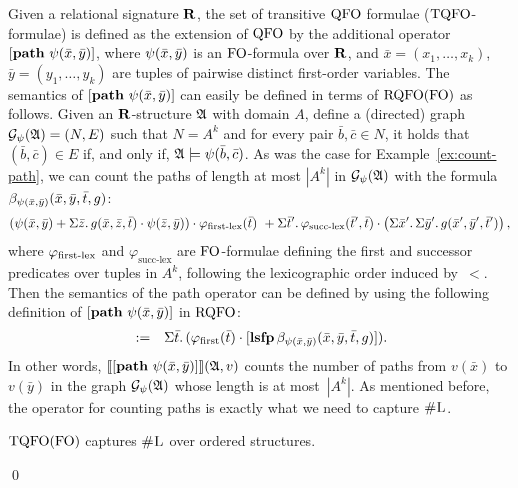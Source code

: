 Given a relational signature $\mathbf{R}$, the set of transitive ${\rm QFO}$ formulae (${\rm TQFO}$-formulae) is defined as the extension of ${\rm QFO}$ by the additional operator $[{\bf path} \,\, \psi(\bar{x},\bar{y})]$, where $\psi(\bar{x}, \bar{y})$ is an ${\rm FO}$-formula over $\mathbf{R}$, and $\bar{x} = (x_1, \ldots, x_k)$, $\bar{y} = (y_1, \ldots, y_k)$ are tuples of pairwise distinct first-order variables. The semantics of $[{\bf path} \,\, \psi(\bar{x},\bar{y})]$ can easily be defined in terms of ${\rm RQFO}({\rm FO})$ as follows. 
Given an $\mathbf{R}$-structure $\mathfrak{A}$ with domain $A$, define a (directed) graph $\mathcal{G}_{\psi}(\mathfrak{A}) = (N,E)$ such that $N = A^k$ and for every pair $\bar b, \bar c \in N$, it holds that $(\bar b, \bar c) \in E$ if, and only if, $\mathfrak{A} \models \psi(\bar b, \bar c)$.
As was the case for Example~\ref{ex:count-path}, we can count the paths of length at most $|A^k|$ in $ \mathcal{G}_{\psi}(\mathfrak{A})$ with the formula $\beta_{\psi(\bar{x},\bar{y})}(\bar{x}, \bar{y}, \bar{t}, g)$:
\begin{align*}
(\psi(\bar{x},\bar{y}) + \Sigma{\bar{z}}.\, g(\bar{x},\bar{z},\bar{t})\cdot \psi(\bar{z},\bar{y})) \cdot \varphi_{\text{\rm first-lex}}(\bar{t}) \ +
\Sigma{\bar{t}'}.\, \varphi_{\text{succ-lex}}(\bar{t}',\bar{t}) \cdot \left(\Sigma{\bar{x}'}.\, \Sigma{\bar{y}'}.\, g(\bar{x}',\bar{y}',\bar{t}') \right),
\end{align*}
where $\varphi_{\text{\rm first-lex}}$ and $\varphi_{\text{succ-lex}}$ are ${\rm FO}$-formulae defining the first and successor predicates over tuples in $A^k$, following the lexicographic order induced by~$<$.
Then the semantics of the path operator can be defined by using the following definition of $[{\bf path} \,\, \psi(\bar{x},\bar{y})]$ in ${\rm RQFO}$:
\begin{eqnarray*}
[\pth \psi(\bar{x}, \bar{y})] & := & \sa{\t} (\varphi_{\text{\rm first}}(\t) \cdot \clfp{\beta_{\psi(\bar{x},\bar{y})}(\x,\y,\t,g)}).
\end{eqnarray*}
In other words, ${\llbracket{}{[{\bf path} \,\, \psi(\bar{x}, \bar{y})]}\rrbracket}(\mathfrak{A},v)$ counts the number of paths from $v(\bar x)$ to $v(\bar y)$ in the graph $\mathcal{G}_{\psi}(\mathfrak{A})$ whose length is at most~$|A^k|$.
As mentioned before, the operator for counting paths is exactly what we need to capture $\text{\sc \#L}$.
\begin{thm} \label{tqfo-shl}
	${\rm TQFO}({\rm FO})$ captures $\text{\sc \#L}$ over ordered structures.
\end{thm}
\proof

\qed

